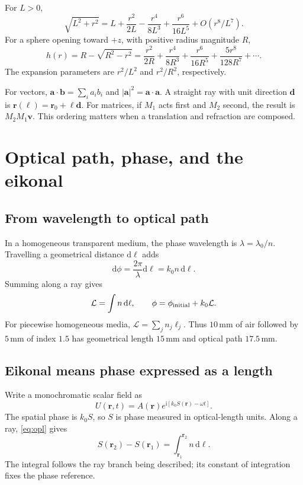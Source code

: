 \documentclass[11pt,a4paper]{article}
\numberwithin{equation}{section}
\newcommand{\dd}{\mathrm{d}}
\newcommand{\ii}{\mathrm{i}}
\newcommand{\vct}[1]{\bm{#1}}
\newcommand{\mm}{\,\mathrm{mm}}
\begin{document}
For $L>0$,
\begin{equation}
 \sqrt{L^2+r^2}
 =L+\frac{r^2}{2L}-\frac{r^4}{8L^3}
 +\frac{r^6}{16L^5}+O(r^8/L^7).
 \label{eq:distance-series}
\end{equation}
For a sphere opening toward $+z$, with positive radius magnitude $R$,
\begin{equation}
 h(r)=R-\sqrt{R^2-r^2}
 =\frac{r^2}{2R}+\frac{r^4}{8R^3}
 +\frac{r^6}{16R^5}+\frac{5r^8}{128R^7}+\cdots.
\end{equation}
The expansion parameters are $r^2/L^2$ and $r^2/R^2$, respectively.

For vectors, $\vct a\cdot\vct b=\sum_i a_i b_i$ and
$|\vct a|^2=\vct a\cdot\vct a$. A straight ray with unit direction
$\vct d$ is $\vct r(\ell)=\vct r_0+\ell\vct d$.
For matrices, if $M_1$ acts first and $M_2$ second, the result is
$M_2M_1\vct v$. This ordering matters when a translation and refraction
are composed.

\section{Optical path, phase, and the eikonal}
\subsection{From wavelength to optical path}
In a homogeneous transparent medium, the phase wavelength is
$\lambda=\lambda_0/n$. Travelling a geometrical distance $\dd\ell$ adds
\[
 \dd\phi=\frac{2\pi}{\lambda}\dd\ell=k_0 n\,\dd\ell.
\]
Summing along a ray gives
\begin{equation}
 \mathcal L=\int n\,\dd\ell,\qquad
 \phi=\phi_{\rm initial}+k_0\mathcal L.
 \label{eq:opl}
\end{equation}
For piecewise homogeneous media, $\mathcal L=\sum_jn_j\ell_j$.
Thus $10\mm$ of air followed by $5\mm$ of index $1.5$ has geometrical
length $15\mm$ and optical path $17.5\mm$.

\subsection{Eikonal means phase expressed as a length}
Write a monochromatic scalar field as
\begin{equation}
 U(\vct r,t)=A(\vct r)e^{\ii[k_0S(\vct r)-\omega t]}.
\end{equation}
The spatial phase is $k_0S$, so $S$ is phase measured in optical-length
units. Along a ray, \eqref{eq:opl} gives
\begin{equation}
 S(\vct r_2)-S(\vct r_1)=\int_{\vct r_1}^{\vct r_2}n\,\dd\ell.
 \label{eq:eikonal-integral}
\end{equation}
The integral follows the ray branch being described; its constant of
integration fixes the phase reference.
\end{document}
